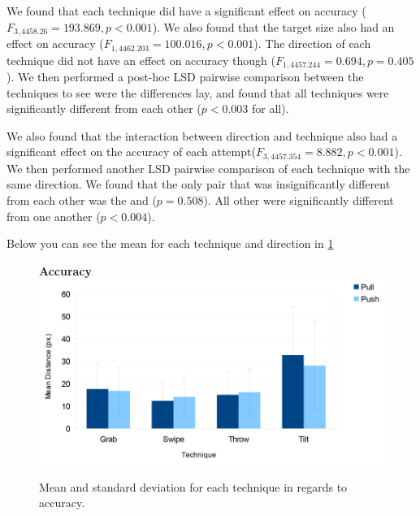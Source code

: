 We found that each technique did have a significant effect on accuracy ($F_{3,4458.26}=193.869, p<0.001$).
We also found that the target size also had an effect on accuracy ($F_{1,4462.203}=100.016, p<0.001$).
The direction of each technique did not have an effect on accuracy though ($F_{1,4457.244}=0.694, p=0.405$). 
We then performed a post-hoc LSD pairwise comparison between the techniques to see were the differences lay, and found that all techniques were significantly different from each other ($p<0.003$ for all).

We also found that the interaction between direction and technique also had a significant effect on the accuracy of each attempt($F_{3,4457.354}=8.882, p<0.001$). 
We then performed another LSD pairwise comparison of each technique with the same direction. 
We found that the only pair that was insignificantly different from each other was the \push \grab and \throw ($p=0.508$). 
All other were significantly different from one another ($p<0.004$). 

Below you can see the mean for each technique and direction in \cref{fig:accuracyGraph}
\begin{figure}[H]{
	\centering
	\textbf{Accuracy}\\[4pt]
	\includegraphics[width = 1\columnwidth ]{images/distance_graph.pdf}} 
	\caption{
		Mean and standard deviation for each technique in regards to accuracy.
	}
	\label{fig:accuracyGraph}
\end{figure}




